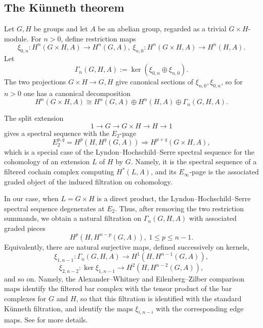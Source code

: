 \documentclass[12pt]{amsart}
\numberwithin{equation}{section}
\theoremstyle{definition}
\newcommand{\1}{_{(1)}}
\newcommand{\2}{_{(2)}}
\newcommand{\3}{_{(3)}}
\newcommand{\4}{_{(4)}}
\newcommand{\5}{_{(5)}}
\newcommand{\6}{_{(6)}}
\theoremstyle{plain}
\theoremstyle{definition}
\theoremstyle{remark}
\begin{document}
\subsection{The K\"unneth theorem}

Let $G,H$ be groups and let $A$ be an abelian group, regarded as a trivial $G\times H$-module.  For $n>0$, define restriction maps 
$$
\xi_{0,n}: H^n(G\times H,A)\to H^n(G,A),\ \xi_{n,0}: H^n(G\times H,A)\to H^n(H,A).
$$ 
Let 
\[
\Gamma_n(G,H,A):=\ker(\xi_{0,n}\oplus \xi_{n,0}).
\]
The two projections $G\times H\to G,H$ give canonical sections of $\xi_{n,0},\xi_{0,n}$,
 so for $n>0$ one has a canonical decomposition
\[
H^n(G\times H,A)\cong H^n(G,A)\oplus H^n(H,A)\oplus \Gamma_n(G,H,A).
\]

The split extension
\[
1\to G\to G\times H\to H\to 1
\]
gives a spectral sequence with the $E_2$-page
\[
E_2^{p,q}=H^p(H,H^q(G,A))\Rightarrow H^{p+q}(G\times H,A),
\]
which is a special case of the Lyndon--Hochschild--Serre spectral sequence for the cohomology of an extension
$L$ of $H$ by $G$. Namely, it is the spectral sequence of a filtered cochain complex computing $H^*(L,A)$, and its $E_\infty$-page is the associated graded object of the induced filtration on cohomology. 

In our case, when $L=G\times H$ is a direct product, the Lyndon--Hochschild--Serre spectral sequence degenerates at $E_2$.
 Thus, 
after removing the two restriction summands, we obtain a natural filtration on $\Gamma_n(G,H,A)$ with associated graded pieces
\[
H^p(H,H^{n-p}(G,A)),\  1\le p\le n-1.
\]
Equivalently, there are natural surjective maps, defined successively on kernels,
\[
\xi_{1,n-1}:\Gamma_n(G,H,A)\to H^1(H,H^{n-1}(G,A)),
\]
\[
\xi_{2,n-2}:\ker\xi_{1,n-1}\to H^2(H,H^{n-2}(G,A)),
\]
and so on. Namely, the Alexander--Whitney and Eilenberg--Zilber comparison maps identify the filtered bar complex with the tensor product of the bar complexes for $G$ and $H$, so that this filtration is identified with the standard K\"unneth filtration, and identify the maps $\xi_{i,n-i}$ with the corresponding edge maps. See \cite[Chapter VII, Sections 6--7]{Brown} for more details.
\end{document}
